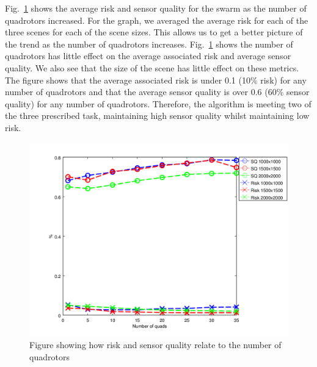 \documentclass{article}
\begin{document}
Fig.~\ref{fig:nqs_r_sq} shows the average risk and sensor quality for the swarm
as the number of quadrotors increased. For the graph, we averaged the average
risk for each of the three scenes for each of the scene sizes. This allows us
to get a better picture of the trend as the number of quadrotors increases.
Fig.~\ref{fig:nqs_r_sq} shows the number of quadrotors has little effect on the
average associated risk and average sensor quality. We also see that the size
of the scene has little effect on these metrics. The figure shows that the
average associated risk is under 0.1 (10\% risk) for any number of quadrotors
and that the average sensor quality is over 0.6 (60\% sensor quality) for any
number of quadrotors. Therefore, the algorithm is meeting two of the three
prescribed task, maintaining high sensor quality whilst maintaining low risk.

\begin{figure}[h!]

    \includegraphics[width=1\columnwidth]{tasefigs/perf_quads_sq_risk.png}

    \caption{Figure showing how risk and sensor quality relate to the number of
    quadrotors}

    \label{fig:nqs_r_sq}

\end{figure}
\end{document}
